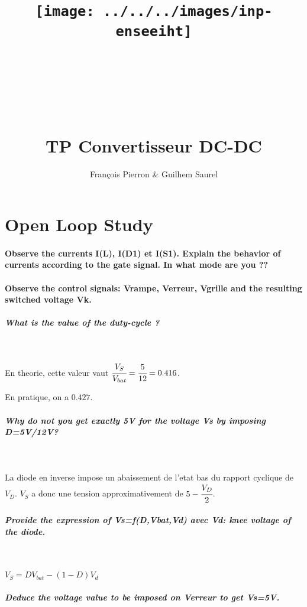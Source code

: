 \documentclass{article}
\title{\texttt{[image: ../../../images/inp-enseeiht]} \\ ~ \\ ~ \\ ~ \\ ~ \\ TP Convertisseur DC-DC}
\author{François Pierron \& Guilhem Saurel}
\date{\oldstylenums{\today}}
\begin{document}
\begin{titlepage}
    \setcounter{page}{0}
    \maketitle
    \vfill
    \tableofcontents
    \thispagestyle{empty}
\end{titlepage}


\section{Open Loop Study}

\paragraph{Observe the currents I(L), I(D1) et I(S1). Explain the behavior of currents according to the gate signal. In what mode are you ??}


\paragraph{Observe the control signals: Vrampe, Verreur, Vgrille and the resulting switched voltage Vk.}


\subparagraph{What is the value of the duty-cycle ?}

~

En theorie, cette valeur vaut $\cfrac{V_S}{V_{bat}} = \cfrac{5}{12} = 0.416$.

En pratique, on a $0.427$.

\subparagraph{Why do not you get exactly 5V for the voltage Vs by imposing D=5V/12V?}

~

La diode en inverse impose un abaissement de l’etat bas du rapport cyclique de $V_D$. $V_S$ a donc une tension approximativement de $5-\cfrac{V_D}{2}$.



\subparagraph{Provide the expression of Vs=f(D,Vbat,Vd) avec Vd: knee voltage of the diode.}

~

$V_S = D V_{bat} - (1 - D)V_d$

\subparagraph{Deduce the voltage value to be imposed on Verreur to get Vs=5V.}
\end{document}

